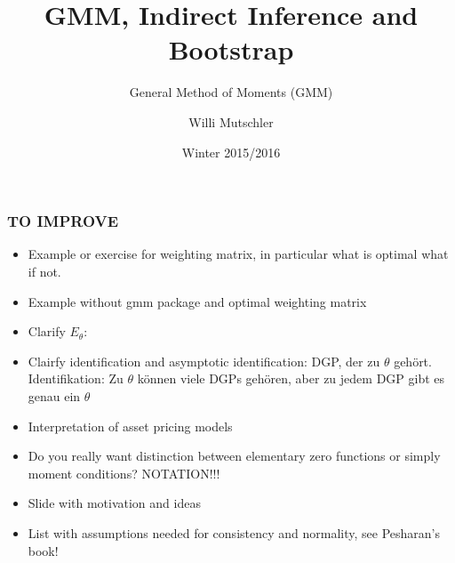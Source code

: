 \documentclass{beamer}
\begin{document}
\title{GMM, Indirect Inference and Bootstrap}
\subtitle{General Method of Moments (GMM)}
\author[Willi Mutschler]{Willi Mutschler}
\date{Winter 2015/2016}
\maketitle

\begin{frame}\frametitle{TO IMPROVE}
  \begin{itemize}
    \item Example or exercise for weighting matrix, in particular what is optimal what if not.
    \item Example without gmm package and optimal weighting matrix
    \item Clarify $E_{\theta }$:
    \item Clairfy identification and asymptotic identification: DGP, der zu $\theta$ gehört. Identifikation: Zu $\theta$ können viele DGPs gehören, aber zu jedem DGP gibt es genau ein $\theta$
    \item Interpretation of asset pricing models
    \item Do you really want distinction between elementary zero functions or simply moment conditions? NOTATION!!!
    \item Slide with motivation and ideas
    \item List with assumptions needed for consistency and normality, see Pesharan's book!
  \end{itemize}
\end{frame}
\end{document}
